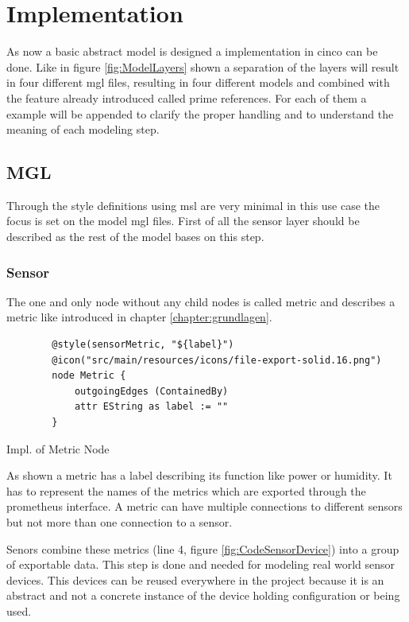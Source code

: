\chapter{Implementation}
\label{chapter:realisierung}
As now a basic abstract model is designed a implementation in cinco can be done. Like in figure \ref{fig:ModelLayers} shown a separation of the layers will result in four different mgl files, resulting in four different models and combined with the feature already introduced called prime references. For each of them a example will be appended to clarify the proper handling and to understand the meaning of each modeling step.
\section{MGL}
Through the style definitions using \gls{msl} are very minimal in this use case the focus is set on the model \gls{mgl} files.
First of all the sensor layer should be described as the rest of the model bases on this step.
\subsection{Sensor}
The one and only node without any child nodes is called metric and describes a metric like introduced in chapter \ref{chapter:grundlagen}. 
\begin{listing}[H]
	\begin{verbatim}
		@style(sensorMetric, "${label}")
		@icon("src/main/resources/icons/file-export-solid.16.png")
		node Metric {
			outgoingEdges (ContainedBy)
			attr EString as label := ""
		}
	\end{verbatim}
	\caption{Impl. of Metric Node}
	\label{lst:nodeMetric}
\end{listing}
As shown a metric has a label describing its function like power or humidity. It has to represent the names of the metrics which are exported through the prometheus interface. A metric can have multiple connections to different sensors but not more than one connection to a sensor.

Senors combine these metrics (line 4, figure \ref{fig:CodeSensorDevice}) into a group of exportable data. This step is done and needed for modeling real world sensor devices. This devices can be reused everywhere in the project because it is an abstract and not a concrete instance of the device holding configuration or being used. 


